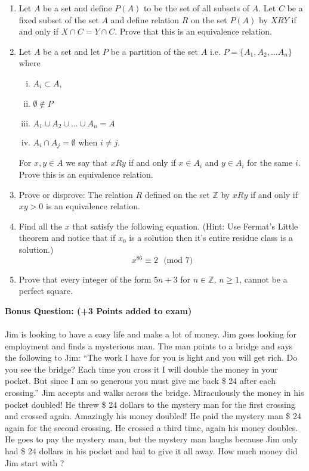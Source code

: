 \documentclass[12pt,letterpaper]{article}
\theoremstyle{plain}
\theoremstyle{definition}
\begin{document}
\begin{enumerate}[1.]
\item Let $A$ be a set and define $P(A)$ to be the set of all subsets of $A$. Let $C$ be a fixed subset of the set $A$ and define relation $R$ on the set $P(A)$ by $X R Y$ if and only if $X\cap C=Y\cap C$. Prove that this is an equivalence relation. 
\ \\
\item Let $A$ be a set and let $P$ be a partition of the set $A$ i.e. $P=\{A_1, A_2, \ldots A_n\}$ where 
\begin{enumerate}[i)]
\item $A_i\subset A$, 
\item $\emptyset \not \in P$
\item $A_1\cup A_2\cup \ldots \cup A_n=A$ 
\item $A_i\cap A_j =\emptyset $ when $i\neq j$. 
\end{enumerate}
For $x,y \in A$ we say that $x R y$ if and only if $x\in A_i$ and $y\in A_i$ for the same $i$. Prove this is an equivalence relation. 
\item Prove or disprove: The relation $R$ defined on the set $\mathbb{Z}$ by $x R y$ if and only if $xy>0$ is an equivalence relation. 
\item Find all the $x$ that satisfy the following equation. (Hint: Use Fermat's Little theorem and notice that if $x_0$ is a solution then it's entire residue class is a solution.) 
\[x^{86} \equiv 2\ \ \  \text{(mod 7)}\]
\item Prove that every integer of the form $5n+3$ for $n\in \mathbb{Z}$, $n\geq 1$, cannot be a perfect square.  
\end{enumerate}
{\bf Bonus Question: (+3 Points added to exam)}\\
\ \\
Jim is looking to have a easy life and make a lot of money. Jim goes looking for employment and finds a mysterious man. The man points to a bridge and says the following to Jim: ``The work I have for you is light and you will get rich. Do you see the bridge? Each time you cross it I will double the money in your pocket. But since I am so generous you must give me back \$ 24 after each crossing.'' Jim accepts and walks across the bridge. Miraculously the money in his pocket doubled! He threw \$ 24 dollars to the mystery man for the first crossing and crossed again.  Amazingly his money doubled! He paid the mystery man \$ 24 again for the second crossing. He crossed a third time, again his money doubles. He goes to pay the mystery man, but the mystery man laughs because Jim only had \$ 24 dollars in his pocket and had to give it all away. How much money did Jim start with ?
\end{document}
